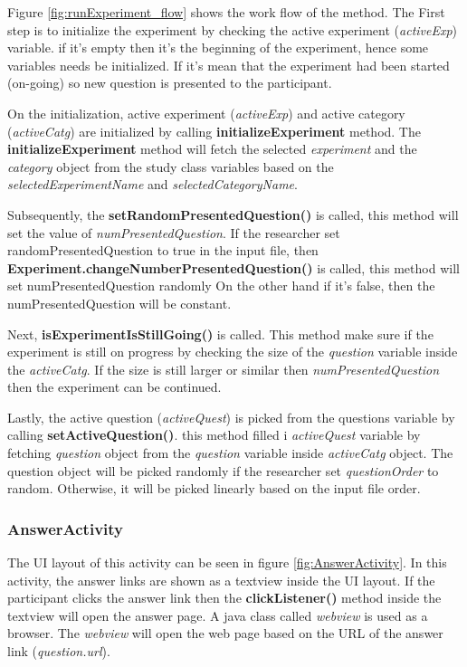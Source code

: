 Figure \ref{fig:runExperiment_flow} shows the work flow of the method. The First step is to initialize the experiment by checking the active experiment (\textit{activeExp}) variable.
   if it's empty then it's the beginning of the experiment, hence some variables needs be initialized. If it's mean that the experiment had been started (on-going)
 so new question is presented to the participant.


On the initialization, active experiment (\textit{activeExp}) and active category (\textit{activeCatg}) are initialized by calling \textbf{initializeExperiment} method.
The \textbf{initializeExperiment} method will fetch the selected \textit{experiment} and the
\textit{category} object from the study class variables based on the \textit{selectedExperimentName} and \textit{selectedCategoryName}.


Subsequently, the \textbf{setRandomPresentedQuestion()} is called, this method will set the value of \textit{numPresentedQuestion}.
If the researcher set randomPresentedQuestion to true in the input file, then \textbf{Experiment.changeNumberPresentedQuestion()} is called, this method will set numPresentedQuestion randomly
On the other hand if it's false, then the numPresentedQuestion will be constant.

Next, \textbf{isExperimentIsStillGoing()} is called. This method make sure if the experiment is still on progress by checking the size of the
\textit{question} variable inside the \textit{activeCatg}. If the size is still larger or similar then \textit{numPresentedQuestion} then the experiment can be continued.

Lastly, the active question (\textit{activeQuest}) is picked from the questions variable by calling \textbf{setActiveQuestion()}. this method filled
 i \textit{activeQuest} variable by fetching \textit{question} object from the \textit{question} variable inside \textit{activeCatg} object.
  The question object will be picked randomly if the researcher set \textit{questionOrder} to random. Otherwise, it will be picked linearly based on
  the input file order.


\subsubsection{AnswerActivity}
The UI layout of this activity can be seen in figure \ref{fig:AnswerActivity}.
In this activity, the answer links are shown as a textview inside the UI layout. If the participant clicks the answer
link then the \textbf{clickListener()} method inside the textview will open the answer page.
A java class called \textit{webview} is used as a browser. The \textit{webview} will open the web page based on the URL of the answer link (\textit{question.url}).

